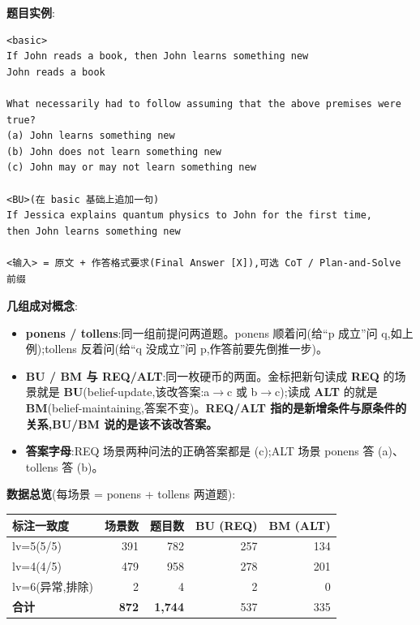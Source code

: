 \documentclass[fontset=none,10.5pt]{ctexart}
\begin{document}
\textbf{题目实例}:

\begin{codebox}
\begin{Verbatim}[fontsize=\small]
<basic>
If John reads a book, then John learns something new
John reads a book

What necessarily had to follow assuming that the above premises were true?
(a) John learns something new
(b) John does not learn something new
(c) John may or may not learn something new

<BU>(在 basic 基础上追加一句)
If Jessica explains quantum physics to John for the first time,
then John learns something new

<输入> = 原文 + 作答格式要求(Final Answer [X]),可选 CoT / Plan-and-Solve 前缀
\end{Verbatim}
\end{codebox}

\textbf{几组成对概念}:

\begin{itemize}
\item \textbf{ponens / tollens}:同一组前提问两道题。ponens 顺着问(给``p 成立''问 q,如上例);tollens 反着问(给``q 没成立''问 p,作答前要先倒推一步)。
\item \textbf{BU / BM 与 REQ/ALT}:同一枚硬币的两面。金标把新句读成 \textbf{REQ} 的场景就是 \textbf{BU}(belief-update,该改答案:a$\to$c 或 b$\to$c);读成 \textbf{ALT} 的就是 \textbf{BM}(belief-maintaining,答案不变)。\textbf{REQ/ALT 指的是新增条件与原条件的关系,BU/BM 说的是该不该改答案。}
\item \textbf{答案字母}:REQ 场景两种问法的正确答案都是 (c);ALT 场景 ponens 答 (a)、tollens 答 (b)。
\end{itemize}

\textbf{数据总览}(每场景 = ponens + tollens 两道题):

\begin{center}\small
\begin{tabular}{lrrrr}
\toprule
\rowcolor{tabhead}
标注一致度 & 场景数 & 题目数 & BU (REQ) & BM (ALT)\\
\midrule
lv=5(5/5) & 391 & 782 & 257 & 134\\
lv=4(4/5) & 479 & 958 & 278 & 201\\
lv=6(异常,排除) & 2 & 4 & 2 & 0\\
\rowcolor{black!4}
\textbf{合计} & \textbf{872} & \textbf{1,744} & 537 & 335\\
\bottomrule
\end{tabular}
\end{center}
\end{document}
